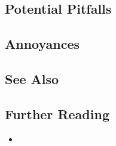 \subsection[Potential Pitfalls]{Potential Pitfalls}\label{potential-pitfalls}

\hspace*{\fill}

\subsection[Annoyances]{Annoyances}\label{annoyances}

\hspace*{\fill}

\subsection[See Also]{See Also}\label{see-also}

\hspace*{\fill}

\subsection[Further Reading]{Further Reading}\label{further-reading}

\begin{itemize}
\item{\cite{meyers15a}}
\end{itemize}

